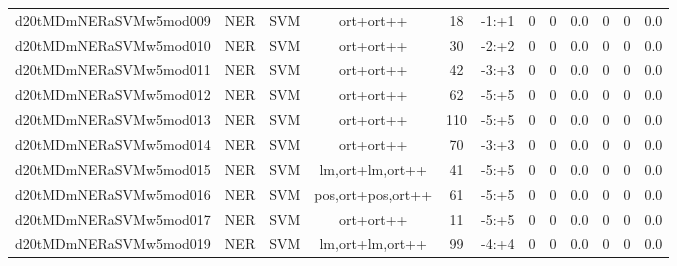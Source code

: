 \documentclass[a4paper]{article}
\begin{document}
\begin{landscape}
\begin{center}
\begin{tabular}{ |c|c|c|c|c|c|c|c|c|c|c|c|}
 
 	
 	\small{ d20tMDmNERaSVMw5mod009 } & \small{ NER} & \small{  SVM }  & ort+ort++  &  18 &  \small{  -1:+1 }  &  0 & 0 & 0.0  &  0 & 0 & 0.0 \\
 	

 
 	
 	\small{ d20tMDmNERaSVMw5mod010 } & \small{ NER} & \small{  SVM }  & ort+ort++  &  30 &  \small{  -2:+2 }  &  0 & 0 & 0.0  &  0 & 0 & 0.0 \\
 	

 
 	
 	\small{ d20tMDmNERaSVMw5mod011 } & \small{ NER} & \small{  SVM }  & ort+ort++  &  42 &  \small{  -3:+3 }  &  0 & 0 & 0.0  &  0 & 0 & 0.0 \\
 	

 
 	
 	\small{ d20tMDmNERaSVMw5mod012 } & \small{ NER} & \small{  SVM }  & ort+ort++  &  62 &  \small{  -5:+5 }  &  0 & 0 & 0.0  &  0 & 0 & 0.0 \\
 	

 
 	
 	\small{ d20tMDmNERaSVMw5mod013 } & \small{ NER} & \small{  SVM }  & ort+ort++  &  110 &  \small{  -5:+5 }  &  0 & 0 & 0.0  &  0 & 0 & 0.0 \\
 	

 
 	
 	\small{ d20tMDmNERaSVMw5mod014 } & \small{ NER} & \small{  SVM }  & ort+ort++  &  70 &  \small{  -3:+3 }  &  0 & 0 & 0.0  &  0 & 0 & 0.0 \\
 	

 
 	
 	\small{ d20tMDmNERaSVMw5mod015 } & \small{ NER} & \small{  SVM }  & lm,ort+lm,ort++  &  41 &  \small{  -5:+5 }  &  0 & 0 & 0.0  &  0 & 0 & 0.0 \\
 	

 
 	
 	\small{ d20tMDmNERaSVMw5mod016 } & \small{ NER} & \small{  SVM }  & pos,ort+pos,ort++  &  61 &  \small{  -5:+5 }  &  0 & 0 & 0.0  &  0 & 0 & 0.0 \\
 	

 
 	
 	\small{ d20tMDmNERaSVMw5mod017 } & \small{ NER} & \small{  SVM }  & ort+ort++  &  11 &  \small{  -5:+5 }  &  0 & 0 & 0.0  &  0 & 0 & 0.0 \\
 	

 
 	
 	\small{ d20tMDmNERaSVMw5mod019 } & \small{ NER} & \small{  SVM }  & lm,ort+lm,ort++  &  99 &  \small{  -4:+4 }  &  0 & 0 & 0.0  &  0 & 0 & 0.0 \\
 	


\end{tabular}
\end{center}
\end{landscape}
\end{document}
